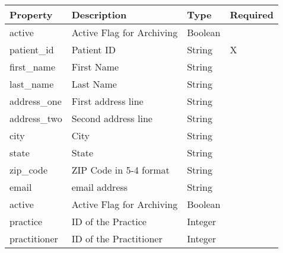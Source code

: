 \documentclass[letterpaper,10pt,english]{sphinxmanual}
\begin{document}
\begin{tabulary}{\linewidth}{|L|L|L|L|}
\hline
\textsf{\relax 
Property
} & \textsf{\relax 
Description
} & \textsf{\relax 
Type
} & \textsf{\relax 
Required
}\\
\hline
active
 & 
Active Flag for Archiving
 & 
Boolean
 & \\

patient\_id
 & 
Patient ID
 & 
String
 & 
X
\\

first\_name
 & 
First Name
 & 
String
 & \\

last\_name
 & 
Last Name
 & 
String
 & \\

address\_one
 & 
First address line
 & 
String
 & \\

address\_two
 & 
Second address line
 & 
String
 & \\

city
 & 
City
 & 
String
 & \\

state
 & 
State
 & 
String
 & \\

zip\_code
 & 
ZIP Code in 5-4 format
 & 
String
 & \\

email
 & 
email address
 & 
String
 & \\

active
 & 
Active Flag for Archiving
 & 
Boolean
 & \\

practice
 & 
ID of the Practice
 & 
Integer
 & \\

practitioner
 & 
ID of the Practitioner
 & 
Integer
 & \\
\hline\end{tabulary}
\end{document}

